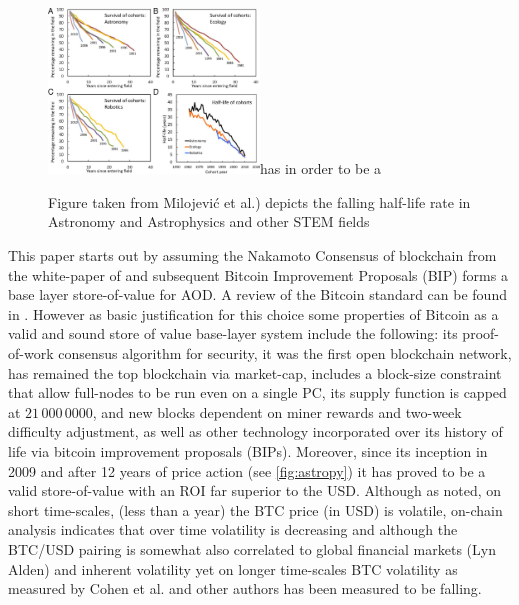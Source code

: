 \documentclass[final,5p,times,twocolumn,authoryear]{elsarticle}
\begin{document}
\begin{figure}[h!]
    \centering
    \label{fig:F4.large}
  \caption{Figure taken from Milojević et al.) depicts the falling half-life rate in Astronomy and Astrophysics and other STEM fields}
  \includegraphics[width=0.5\textwidth]{figs/F4.large.jpg}has in order to be a
\end{figure}
This paper starts out by assuming the Nakamoto Consensus of blockchain from the white-paper of \cite{nak2009} and subsequent Bitcoin Improvement Proposals (BIP) forms a base layer store-of-value for AOD. A review of the Bitcoin standard can be found in \citet{Hansen2020Book}. However as basic justification for this choice some properties of Bitcoin as a valid and sound store of value base-layer system include the following: its proof-of-work consensus algorithm for security, it was the first open blockchain network, has remained the top blockchain via market-cap, includes a block-size constraint that allow full-nodes to be run even on a single PC, its supply function is capped at $21\,000\,0000$, and new blocks dependent on miner rewards and two-week difficulty adjustment, as well as other technology incorporated over its history of life via bitcoin improvement proposals (BIPs). Moreover, since its inception in 2009 and after 12 years of price action (see \ref{fig:astropy}) it has proved to be a valid store-of-value with an ROI far superior to the USD. Although as noted, on short time-scales, (less than a year) the BTC price (in USD) is volatile, on-chain analysis indicates that over time volatility is decreasing and although the BTC/USD pairing is somewhat also correlated to global financial markets (Lyn Alden) and inherent volatility yet on longer time-scales BTC volatility as measured by Cohen et al. and other authors has been measured to be falling. 
\end{document}
